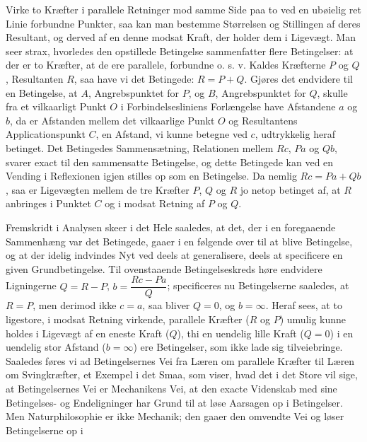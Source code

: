 \documentclass[12pt,a4paper]{book}
\begin{document}
Virke to Kræfter i parallele Retninger mod samme Side paa to ved en
ubøielig ret Linie forbundne Punkter, saa kan man bestemme Størrelsen og
Stillingen af deres Resultant, og derved af en denne modsat Kraft, der
holder dem i Ligevægt. Man seer strax, hvorledes den opstillede
Betingelse sammenfatter flere Betingelser: at der er to Kræfter, at de
ere parallele, forbundne o. s. v. Kaldes Kræfterne $P$ og $Q$,
Resultanten $R$, saa have vi det Betingede: $R = P + Q$. Gjøres det
endvidere til en Betingelse, at $A$, Angrebspunktet for $P$, og $B$,
Angrebspunktet for $Q$, skulle fra et vilkaarligt Punkt $O$ i
Forbindelsesliniens Forlængelse have Afstandene $a$ og $b$, da er
Afstanden mellem det vilkaarlige Punkt $O$ og Resultantens
Applicationspunkt $C$, en Afstand, vi kunne betegne ved $c$, udtrykkelig
heraf betinget. Det Betingedes Sammensætning, Relationen mellem $Rc$,
$Pa$ og $Qb$, svarer exact til den sammensatte Betingelse, og dette
Betingede kan ved en Vending i Reflexionen igjen stilles op som en
Betingelse. Da nemlig $Rc = Pa + Qb$, saa er Ligevægten mellem de tre
Kræfter $P$, $Q$ og $R$ jo netop betinget af, at $R$ anbringes i Punktet
$C$ og i modsat Retning af $P$ og $Q$.

Fremskridt i Analysen skeer i det Hele saaledes, at det, der i en
foregaaende Sammenhæng var det Betingede, gaaer i en følgende over til at
blive Betingelse, og at der idelig indvindes Nyt ved deels at
generalisere, deels at specificere en given Grundbetingelse. Til
ovenstaaende Betingelseskreds høre endvidere Ligningerne $Q = R - P$,
$b = \dfrac{Rc - Pa}{Q}$; specificeres nu Betingelserne saaledes, at
$R = P$, men derimod ikke $c = a$, saa bliver $Q = 0$, og
$b = \infty$. Heraf sees, at to ligestore, i modsat Retning virkende,
parallele Kræfter ($R$ og $P$) umulig kunne holdes i Ligevægt af en
eneste Kraft ($Q$), thi en uendelig lille Kraft ($Q = 0$) i en uendelig
stor Afstand ($b = \infty$) ere Betingelser, som ikke lade sig
tilveiebringe. Saaledes føres vi
ad Betingelsernes Vei fra Læren om parallele Kræfter til Læren om
Svingkræfter, et Exempel i det Smaa, som viser, hvad det i det Store vil
sige, at Betingelsernes Vei er Mechanikens Vei, at den exacte Videnskab
med sine Betingelses- og Endeligninger har Grund til at løse Aarsagen op
i Betingelser. Men Naturphilosophie er ikke Mechanik; den gaaer den
omvendte Vei og løser Betingelserne op i
\end{document}
